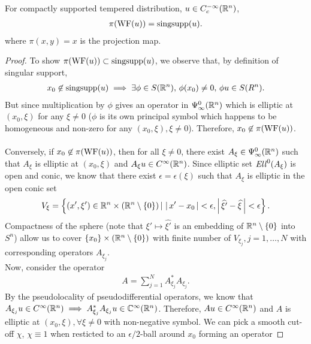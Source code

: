 \documentclass{article}
\begin{document}
\begin{fprop}
    For compactly supported tempered distribution, $u \in C^{-\infty}_c({\mathbb R}^n)$, 
    \begin{align*}
    \pi(\mathrm{WF}(u)) = \mathrm{singsupp}(u). 
    \end{align*}
    where $\pi(x, y) = x$ is the projection map. 
\end{fprop}
\begin{proof}
    To show $\pi(\mathrm{WF}(u)) \subset \mathrm{singsupp}(u)$, we observe that, by definition of singular support, 
    \begin{align*}
    x_0 \not \in \mathrm{singsupp}(u) \implies \exists \phi \in S({\mathbb R}^n), \, \phi(x_0) \neq 0, \, \phi u \in S(R^n). 
    \end{align*}
    But since multiplication by $\phi$ gives an operator in $\Psi^0_\infty({\mathbb R}^n)$ which is elliptic at $(x_0, \xi)$ for any $\xi \neq 0$ ($\phi$ is its own principal symbol which happens to be homogeneous and non-zero for any $(x_0, \xi), \xi \neq 0$). Therefore, $x_0 \not \in \pi(\mathrm{WF}(u))$. \\
    \\
    Conversely, if $x_0 \not\in \pi(\mathrm{WF}(u))$, then for all $\xi \neq 0$, there exist $A_\xi \in \Psi^0_\infty({\mathbb R}^n)$ such that $A_\xi$ is elliptic at $(x_0, \xi)$ and $A_\xi u \in C^\infty({\mathbb R}^n)$. Since elliptic set $\mathit{Ell}^0(A_\xi)$ is open and conic, we know that there exist $\epsilon = \epsilon(\xi)$ such that $A_\xi$ is elliptic in the open conic set
    \begin{align*}
    V_\xi = \left\{(x', \xi')\in {\ensuremath {\mathbb R}}^n \times ({\mathbb R}^n \setminus \left\{0\right\}) \, | \, \left|\, x' - x_0\,\right| < \epsilon, \left|\, \widehat{\xi'} - \widehat{\xi}\,\right| < \epsilon \right\}. 
    \end{align*}
    Compactness of the sphere (note that $\xi' \mapsto \widehat{\xi'}$ is an embedding of ${\mathbb R}^n \setminus \left\{0\right\}$ into $S^n$) allow us to cover $\left\{x_0\right\} \times ({\mathbb R}^n \setminus \left\{0\right\})$ with finite number of $V_{\xi_j}, j = 1, \dots, N$ with corresponding operators $A_{\xi_j}$. \\
    Now, consider the operator
    \begin{align*}
    A = \sum_{j = 1}^N A^*_{\xi_j}A_{\xi_j}. 
    \end{align*}
    By the pseudolocality of pseudodifferential operators, we know that $A_{\xi_j} u \in C^\infty({\mathbb R}^n) \implies A^*_{\xi_j} A_{\xi_j} u \in {\ensuremath {\mathbb C}}^\infty({\mathbb R}^n)$. Therefore, $Au \in C^\infty({\mathbb R}^n)$ and $A$ is elliptic at $(x_0, \xi), \forall \xi \neq 0$ with non-negative symbol. We can pick a smooth cut-off $\chi$, $\chi \equiv 1$ when resticted to an $\epsilon/2$-ball around $x_0$ forming an operator

\end{proof}
\end{document}
